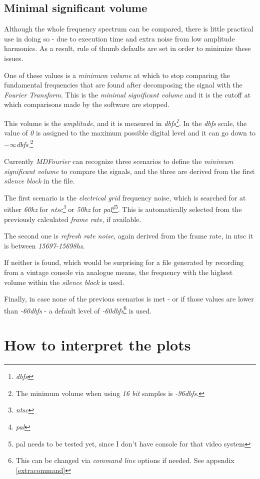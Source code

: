 \documentclass[10pt,a4paper]{report}
\newcommand{\define}[1]{\textit{\acrshort{#1}\footnote{\textit{\acrlong{#1}}}}}
\newcommand{\fhz}[1]{\textit{#1\acrshort{hz}}}
\newcommand{\db}[1]{\textit{#1\acrshort{dbfs}}}
\begin{document}
\section{Minimal significant volume}
\label{MinSigVolume}

Although the whole frequency spectrum can be compared, there is little practical use in doing so -  due to execution time and extra noise from low amplitude harmonics. As a result, rule of thumb defaults are set in order to minimize these issues.

One of these values is a \textit{minimum volume} at which to stop comparing the fundamental frequencies that are found after decomposing the signal with the \textit{Fourier Transform}. This is the \textit{minimal significant volume} and it is the cutoff at which comparisons made by the software are stopped.

This volume is the \textit{amplitude}, and it is measured in \define{dbfs}. In the \textit{\acrshort{dbfs}} scale, the value of \textit{0} is assigned to the maximum possible digital level and it can go down to \db{$-\infty$}.\footnote{The minimum volume when using \textit{16 bit} samples is \db{-96}.}

Currently \textit{MDFourier} can recognize three scenarios to define the \textit{minimum significant volume} to compare the signals, and the three are derived from the first \textit{silence block} in the file.

The first scenario is the \textit{electrical grid} frequency noise, which is searched for at either \fhz{60} for \define{ntsc} or \fhz{50} for \define{pal}\footnote{\acrshort{pal} needs to be tested yet, since I don't have console for that video system}. This is automatically selected from the previously calculated \textit{frame rate}, if available.

The second one is \textit{refresh rate noise}, again derived from the frame rate, in \acrshort{ntsc} it is between \fhz{15697-15698}. 

If neither is found, which would be surprising for a file generated by recording from a vintage console via analogue means, the frequency with the highest volume within the \textit{silence block} is used. 

Finally, in case none of the previous scenarios is met - or if those values are lower than \db{-60} - a default level of \db{-60}\footnote{This can be changed via \textit{command line} options if needed. See appendix \ref{extracommand}} is used. 

\chapter{How to interpret the plots}
\label{howtoplots}
\end{document}
